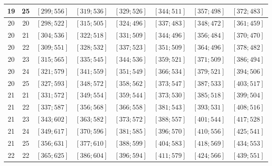 \documentclass[a4paper,12pt]{article}
\begin{document}
\begin{center}
{\begin{longtable}[H]{|c|c|c|c|c|c|c|c|}
19 &  25 &  $\left[ 299; 556\right]$ &  $\left[ 319; 536\right]$ &  $\left[ 329; 526\right]$ &  $\left[ 344; 511\right]$ &  $\left[ 357; 498\right]$ &  $\left[ 372; 483\right]$ \tabularnewline \hline
20 &  20 &  $\left[ 298; 522\right]$ &  $\left[ 315; 505\right]$ &  $\left[ 324; 496\right]$ &  $\left[ 337; 483\right]$ &  $\left[ 348; 472\right]$ &  $\left[ 361; 459\right]$ \tabularnewline \hline
20 &  21 &  $\left[ 304; 536\right]$ &  $\left[ 322; 518\right]$ &  $\left[ 331; 509\right]$ &  $\left[ 344; 496\right]$ &  $\left[ 356; 484\right]$ &  $\left[ 370; 470\right]$ \tabularnewline \hline
20 &  22 &  $\left[ 309; 551\right]$ &  $\left[ 328; 532\right]$ &  $\left[ 337; 523\right]$ &  $\left[ 351; 509\right]$ &  $\left[ 364; 496\right]$ &  $\left[ 378; 482\right]$ \tabularnewline \hline
20 &  23 &  $\left[ 315; 565\right]$ &  $\left[ 335; 545\right]$ &  $\left[ 344; 536\right]$ &  $\left[ 359; 521\right]$ &  $\left[ 371; 509\right]$ &  $\left[ 386; 494\right]$ \tabularnewline \hline
20 &  24 &  $\left[ 321; 579\right]$ &  $\left[ 341; 559\right]$ &  $\left[ 351; 549\right]$ &  $\left[ 366; 534\right]$ &  $\left[ 379; 521\right]$ &  $\left[ 394; 506\right]$ \tabularnewline \hline
20 &  25 &  $\left[ 327; 593\right]$ &  $\left[ 348; 572\right]$ &  $\left[ 358; 562\right]$ &  $\left[ 373; 547\right]$ &  $\left[ 387; 533\right]$ &  $\left[ 403; 517\right]$ \tabularnewline \hline
21 &  21 &  $\left[ 331; 572\right]$ &  $\left[ 349; 554\right]$ &  $\left[ 359; 544\right]$ &  $\left[ 373; 530\right]$ &  $\left[ 385; 518\right]$ &  $\left[ 399; 504\right]$ \tabularnewline \hline
21 &  22 &  $\left[ 337; 587\right]$ &  $\left[ 356; 568\right]$ &  $\left[ 366; 558\right]$ &  $\left[ 381; 543\right]$ &  $\left[ 393; 531\right]$ &  $\left[ 408; 516\right]$ \tabularnewline \hline
21 &  23 &  $\left[ 343; 602\right]$ &  $\left[ 363; 582\right]$ &  $\left[ 373; 572\right]$ &  $\left[ 388; 557\right]$ &  $\left[ 401; 544\right]$ &  $\left[ 417; 528\right]$ \tabularnewline \hline
21 &  24 &  $\left[ 349; 617\right]$ &  $\left[ 370; 596\right]$ &  $\left[ 381; 585\right]$ &  $\left[ 396; 570\right]$ &  $\left[ 410; 556\right]$ &  $\left[ 425; 541\right]$ \tabularnewline \hline
21 &  25 &  $\left[ 356; 631\right]$ &  $\left[ 377; 610\right]$ &  $\left[ 388; 599\right]$ &  $\left[ 404; 583\right]$ &  $\left[ 418; 569\right]$ &  $\left[ 434; 553\right]$ \tabularnewline \hline
22 &  22 &  $\left[ 365; 625\right]$ &  $\left[ 386; 604\right]$ &  $\left[ 396; 594\right]$ &  $\left[ 411; 579\right]$ &  $\left[ 424; 566\right]$ &  $\left[ 439; 551\right]$ \tabularnewline \hline

\end{longtable}}
\end{center}
\end{document}
